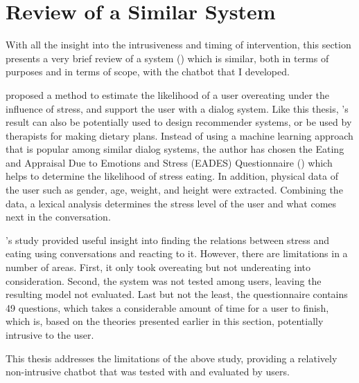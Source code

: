 \section{Review of a Similar System}
With all the insight into the intrusiveness and timing of intervention, this section presents a very brief review of a system (\cite{31_marija}) which is similar, both in terms of purposes and in terms of scope, with the chatbot that I developed.

\citeauthor{31_marija} proposed a method to estimate the likelihood of a user overeating under the influence of stress, and support the user with a dialog system. Like this thesis, \citeauthor{31_marija}'s result can also be potentially used to design recommender systems, or be used by therapists for making dietary plans. Instead of using a machine learning approach that is popular among similar dialog systems, the author has chosen the Eating and Appraisal Due to Emotions and Stress (EADES) Questionnaire (\cite{33_eades}) which helps to determine the likelihood of stress eating. In addition, physical data of the user such as gender, age, weight, and height were extracted. Combining the data, a lexical analysis determines the stress level of the user and what comes next in the conversation.

\citeauthor{31_marija}'s study provided useful insight into finding the relations between stress and eating using conversations and reacting to it. However, there are limitations in a number of areas. First, it only took overeating but not undereating into consideration. Second, the system was not tested among users, leaving the resulting model not evaluated. Last but not the least, the questionnaire contains 49 questions, which takes a considerable amount of time for a user to finish, which is, based on the theories presented earlier in this section, potentially intrusive to the user.\bigskip

\noindent This thesis addresses the limitations of the above study, providing a relatively non-intrusive chatbot that was tested with and evaluated by users.
